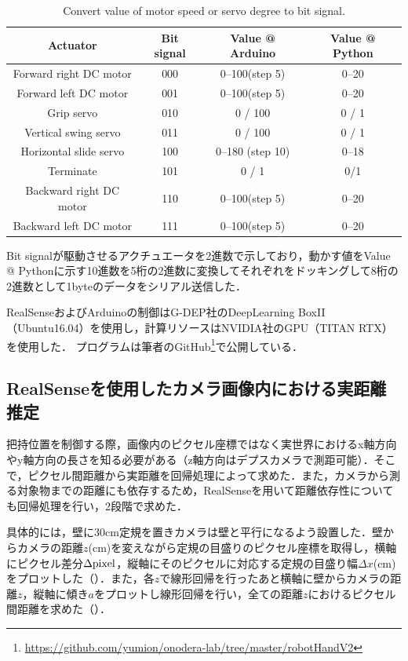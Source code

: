 \begin{table}
    \centering
    \caption{Convert value of motor speed or servo degree to bit signal.}
    \begin{tabular}{cccc}\toprule
        Actuator & Bit signal & Value @ Arduino & Value @ Python \\ \midrule
        Forward right DC motor & 000 & 0--100(step 5) & 0--20  \\ 
        Forward left DC motor & 001 & 0--100(step 5) & 0--20 \\ 
        Grip servo & 010 & 0 / 100 & 0 / 1\\ 
        Vertical swing servo & 011 & 0 / 100 & 0 / 1\\ 
        Horizontal slide servo & 100 & 0--180 (step 10) & 0--18 \\ 
        Terminate & 101 & 0 / 1 & 0/1 \\ 
        Backward right DC motor & 110 & 0--100(step 5) & 0--20 \\ 
        Backward left DC motor & 111 & 0--100(step 5) & 0--20 \\ \bottomrule
    \end{tabular} 
    \label{tab:2号機信号表}
\end{table}

Bit signalが駆動させるアクチュエータを2進数で示しており，動かす値をValue @ Pythonに示す10進数を5桁の2進数に変換してそれぞれをドッキングして8桁の2進数として1byteのデータをシリアル送信した．

RealSenseおよびArduinoの制御はG-DEP社のDeepLearning BoxII（Ubuntu16.04）を使用し，計算リソースはNVIDIA社のGPU（TITAN RTX）を使用した．
プログラムは筆者のGitHub\footnote{\url{https://github.com/yumion/onodera-lab/tree/master/robotHandV2}}で公開している．


\subsection{RealSenseを使用したカメラ画像内における実距離推定}
把持位置を制御する際，画像内のピクセル座標ではなく実世界におけるx軸方向やy軸方向の長さを知る必要がある（z軸方向はデプスカメラで測距可能）．そこで，ピクセル間距離から実距離を回帰処理によって求めた．また，カメラから測る対象物までの距離にも依存するため，RealSenseを用いて距離依存性についても回帰処理を行い，2段階で求めた．

具体的には，壁に30cm定規を置きカメラは壁と平行になるよう設置した．壁からカメラの距離$z$(cm)を変えながら定規の目盛りのピクセル座標を取得し，横軸にピクセル差分$\Delta \rm{pixel}$，縦軸にそのピクセルに対応する定規の目盛り幅$\Delta x$(cm)をプロットした（）．また，各$z$で線形回帰を行ったあと横軸に壁からカメラの距離$z$，縦軸に傾き$a$をプロットし線形回帰を行い，全ての距離$z$におけるピクセル間距離を求めた（）．

